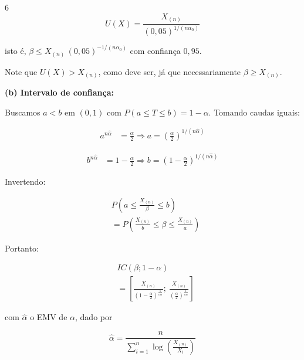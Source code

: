 \documentclass[8pt, a4paper, landscape]{extarticle}
\begin{document}
\begin{multicols}{6}
\begin{equation*}
U(X) = \frac{X_{(n)}}{(0,05)^{1/(n\alpha_0)}}
\end{equation*}

isto é, $\beta \leq X_{(n)}\,(0,05)^{-1/(n\alpha_0)}$ com confiança $0,95$.

Note que $U(X) > X_{(n)}$, como deve ser, já que necessariamente $\beta \geq X_{(n)}$.

\vspace{0.2cm}

\textbf{(b) Intervalo de confiança:}

Buscamos $a < b$ em $(0,1)$ com $P(a \leq T \leq b) = 1-\alpha$. Tomando caudas iguais:

\begin{equation*}
\begin{split}
a^{n\hat{\alpha}} &= \frac{\alpha}{2} \Rightarrow a = \left(\frac{\alpha}{2}\right)^{1/(n\hat{\alpha})}
\end{split}
\end{equation*}

\begin{equation*}
\begin{split}
b^{n\hat{\alpha}} &= 1 - \frac{\alpha}{2} \Rightarrow b = \left(1-\frac{\alpha}{2}\right)^{1/(n\hat{\alpha})}
\end{split}
\end{equation*}

Invertendo:

\begin{equation*}
\begin{split}
&P\left(a \leq \frac{X_{(n)}}{\beta} \leq b\right) \\
&= P\left(\frac{X_{(n)}}{b} \leq \beta \leq \frac{X_{(n)}}{a}\right)
\end{split}
\end{equation*}

Portanto:

\begin{equation*}
\begin{split}
&IC(\beta;1-\alpha) \\
&= \left[\frac{X_{(n)}}{(1-\frac{\alpha}{2})^{\frac{1}{n\hat{\alpha}}}};\ \frac{X_{(n)}}{(\frac{\alpha}{2})^{\frac{1}{n\hat{\alpha}}}}\right]
\end{split}
\end{equation*}

com $\hat{\alpha}$ o EMV de $\alpha$, dado por

\begin{equation*}
\hat{\alpha} = \frac{n}{\sum_{i=1}^{n}\log\left(\frac{X_{(n)}}{X_i}\right)}
\end{equation*}


\end{multicols}
\end{document}
